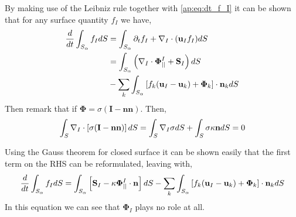 By making use of the Leibniz rule together with \ref{ap:eq:dt_f_I} it can be shown that for any surface quantity $f_I$ we have, 
\begin{align*}
    \frac{d}{d t} \int_{S_\alpha} f_I dS
    &= \int_{S_\alpha} \partial_t f_I 
    + \mathbf{\nabla}_I \cdot (\textbf{u}_If_I) dS\\
    &= \int_{S_\alpha} \left(
        \mathbf{\nabla}_I \cdot \mathbf{\Phi}_{||}^I
        + \textbf{S}_I
    \right) dS\\
    & - \sum_k \int_{S_\alpha} \left[
        f_k (\textbf{u}_I - \textbf{u}_k)
        + \mathbf{\Phi}_k
    \right] \cdot \textbf{n}_k
    dS
\end{align*}
Then remark that if $\mathbf{\Phi} = \sigma (\textbf{I}-\textbf{nn})$.
Then, 
\begin{equation*}
    \int_S \mathbf{\nabla}_I \cdot \left[\sigma (\textbf{I} - \textbf{nn})\right]dS 
    =
    \int_S  \mathbf{\nabla}_I \sigma dS 
    + \int_S \sigma \kappa \textbf{n}dS 
    = 0
\end{equation*}

Using the Gauss theorem for closed surface it can be shown easily that the first term on the RHS can be reformulated, leaving with, 
\begin{align}
    \frac{d}{d t} \int_{S_\alpha} f_I dS
    = \int_{S_\alpha} \left[
        \textbf{S}_I 
        - \kappa \mathbf{\Phi}_{||}^I\cdot \textbf{n} 
    \right]dS
    - \sum_k \int_{S_\alpha} \left[
        f_k (\textbf{u}_I - \textbf{u}_k)
        + \mathbf{\Phi}_k
    \right] \cdot \textbf{n}_k
    dS
\end{align}
In this equation we can see that $\mathbf{\Phi}_I$ plays no role at all. 


